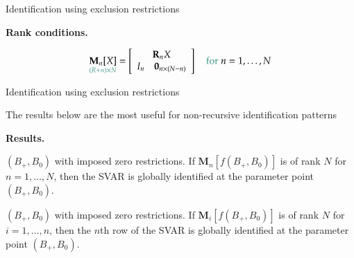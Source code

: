 \documentclass[notes,blackandwhite,mathsans,usenames,dvipsnames]{beamer}
\begin{document}
\begin{frame}{Identification using exclusion restrictions}

\textbf{Rank conditions.}


$$ \underset{\color{mcxs2}(R+n)\times N}{\mathbf{M}_n[X]} = \begin{bmatrix} \mathbf{R}_n X \\ \begin{array}{cr} I_n & \mathbf{0}_{n\times(N-n)}\end{array}\end{bmatrix} \quad\text{\color{mcxs2}for }n=1,\dots,N $$

\end{frame}



\begin{frame}{Identification using exclusion restrictions}

{\color{mcxs2}The results below are the most useful for non-recursive identification patterns}

\bigskip\textbf{Results.}

 $(B_+,B_0)$ {\color{mcxs2}with imposed zero restrictions. If} $\mathbf{M}_n\left[ f\left(B_+,B_0\right) \right]$ {\color{mcxs2}is of rank} $N$ {\color{mcxs2}for $n =1,\dots,N$, then the {\color{purple}SVAR is globally identified} at the parameter point} $(B_+,B_0)$.

 $(B_+,B_0)$ {\color{mcxs2}with imposed zero restrictions. If} $\mathbf{M}_i\left[ f\left(B_+,B_0\right) \right]$ {\color{mcxs2}is of rank} $N$ {\color{mcxs2}for $i =1,\dots,n$, then the {\color{purple}$n$th row of the SVAR is globally identified} at the parameter point} $(B_+,B_0)$.


\end{frame}
\end{document}
